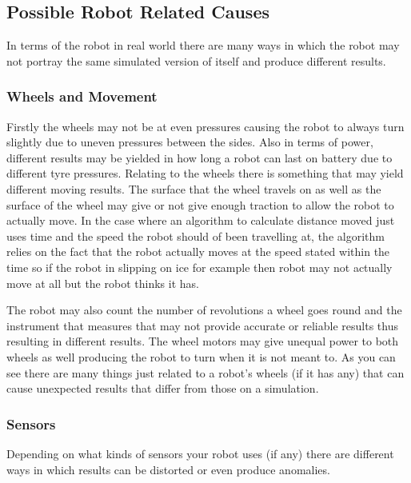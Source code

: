 \documentclass[a4paper,12pt]{article}
\begin{document}
\subsection{Possible Robot Related Causes}

\noindent In terms of the robot in real world there are many ways in which the robot may not portray the same simulated version of itself and produce different results.

\subsubsection{Wheels and Movement}
Firstly the wheels may not be at even pressures causing the robot to always turn slightly due to uneven pressures between the sides. Also in terms of power, different results may be yielded in how long a robot can last on battery due to different tyre pressures. Relating to the wheels there is something that may yield different moving results. The surface that the wheel travels on as well as the surface of the wheel may give or not give enough traction to allow the robot to actually move. In the case where an algorithm to calculate distance moved just uses time and the speed the robot should of been travelling at, the algorithm relies on the fact that the robot actually moves at the speed stated within the time so if the robot in slipping on ice for example then robot may not actually move at all but the robot thinks it has.

\vspace{5mm}
\noindent The robot may also count the number of revolutions a wheel goes round and the instrument that measures that may not provide accurate or reliable results thus resulting in different results. The wheel motors may give unequal power to both wheels as well producing the robot to turn when it is not meant to. As you can see there are many things just related to a robot's wheels (if it has any) that can cause unexpected results that differ from those on a simulation.

\subsubsection{Sensors}

\noindent Depending on what kinds of sensors your robot uses (if any) there are different ways in which results can be distorted or even produce anomalies.
\end{document}
